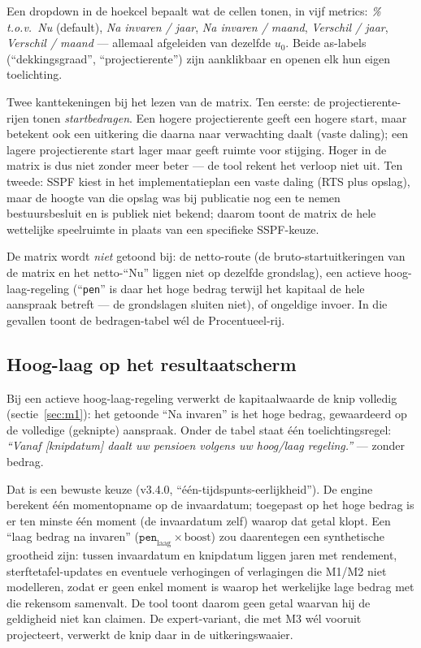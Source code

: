 \documentclass[11pt,a4paper]{article}
\newcommand{\code}[1]{\texttt{#1}}
\begin{document}
Een dropdown in de hoekcel bepaalt wat de cellen tonen, in vijf metrics: \emph{\% t.o.v.\ Nu} (default), \emph{Na invaren / jaar}, \emph{Na invaren / maand}, \emph{Verschil / jaar}, \emph{Verschil / maand} --- allemaal afgeleiden van dezelfde $u_0$. Beide as-labels (``dekkingsgraad'', ``projectierente'') zijn aanklikbaar en openen elk hun eigen toelichting.

Twee kanttekeningen bij het lezen van de matrix. Ten eerste: de projectierente-rijen tonen \emph{startbedragen}. Een hogere projectierente geeft een hogere start, maar betekent ook een uitkering die daarna naar verwachting daalt (vaste daling); een lagere projectierente start lager maar geeft ruimte voor stijging. Hoger in de matrix is dus niet zonder meer beter --- de tool rekent het verloop niet uit. Ten tweede: SSPF kiest in het implementatieplan een vaste daling (RTS plus opslag), maar de hoogte van die opslag was bij publicatie nog een te nemen bestuursbesluit en is publiek niet bekend; daarom toont de matrix de hele wettelijke speelruimte in plaats van een specifieke SSPF-keuze.

De matrix wordt \emph{niet} getoond bij: de netto-route (de bruto-startuitkeringen van de matrix en het netto-``Nu'' liggen niet op dezelfde grondslag), een actieve hoog-laag-regeling (``\code{pen}'' is daar het hoge bedrag terwijl het kapitaal de hele aanspraak betreft --- de grondslagen sluiten niet), of ongeldige invoer. In die gevallen toont de bedragen-tabel wél de Procentueel-rij.

\subsection{Hoog-laag op het resultaatscherm}

Bij een actieve hoog-laag-regeling verwerkt de kapitaalwaarde de knip volledig (sectie~\ref{sec:m1}): het getoonde ``Na invaren'' is het hoge bedrag, gewaardeerd op de volledige (geknipte) aanspraak. Onder de tabel staat één toelichtingsregel: \emph{``Vanaf [knipdatum] daalt uw pensioen volgens uw hoog/laag regeling.''} --- zonder bedrag.

Dat is een bewuste keuze (v3.4.0, ``één-tijdspunts-eerlijkheid''). De engine berekent één momentopname op de invaardatum; toegepast op het hoge bedrag is er ten minste één moment (de invaardatum zelf) waarop dat getal klopt. Een ``laag bedrag na invaren'' ($\code{pen}_{\text{laag}} \times \text{boost}$) zou daarentegen een synthetische grootheid zijn: tussen invaardatum en knipdatum liggen jaren met rendement, sterftetafel-updates en eventuele verhogingen of verlagingen die M1/M2 niet modelleren, zodat er geen enkel moment is waarop het werkelijke lage bedrag met die rekensom samenvalt. De tool toont daarom geen getal waarvan hij de geldigheid niet kan claimen. De expert-variant, die met M3 wél vooruit projecteert, verwerkt de knip daar in de uitkeringswaaier.
\end{document}
